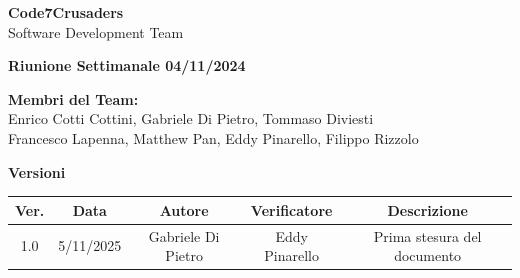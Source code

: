 \documentclass{article}
\begin{document}
\begin{titlepage}
    {\Huge \textbf{Code7Crusaders}}\\
    \vspace{0.5cm}
    {\Large Software Development Team}\\
    \vspace{2cm}
    
    {\large \textbf{Riunione Settimanale 04/11/2024}}\\
    \vspace{5cm}

    \textbf{Membri del Team:}\\
    Enrico Cotti Cottini, Gabriele Di Pietro, Tommaso Diviesti \\
    Francesco Lapenna, Matthew Pan, Eddy Pinarello, Filippo Rizzolo \\
    \vspace{0.5cm}
    
    \vspace{1cm}
\end{titlepage}

\newpage
\begin{table}[h!]
\centering
\textbf{Versioni} \\ %
\vspace{2mm} %
\begin{tabular}{|c|c|c|c|c|}
    \hline
    \textbf{Ver.} & \textbf{Data} & \textbf{Autore} & \textbf{Verificatore} & \textbf{Descrizione} \\
    \hline
    1.0 & 5/11/2025 & Gabriele Di Pietro & Eddy Pinarello & Prima stesura del documento \\ 
    \hline
\end{tabular}
\end{table}

\newpage
\tableofcontents

\newpage
\end{document}
